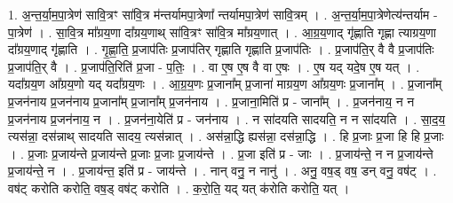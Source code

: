 \documentclass[17pt]{extarticle}
\begin{document}
1. अ॒न्त॒र्या॒म॒पा॒त्रेण॑ सावि॒त्रꣳ सा॑वि॒त्र म॑न्तर्यामपा॒त्रेणा᳚ न्तर्यामपा॒त्रेण॑ सावि॒त्रम् । . अ॒न्त॒र्या॒म॒पा॒त्रेणेत्य॑न्तर्याम - पा॒त्रेण॑ । . सा॒वि॒त्र मा᳚ग्रय॒णा दा᳚ग्रय॒णाथ् सा॑वि॒त्रꣳ सा॑वि॒त्र मा᳚ग्रय॒णात् । . आ॒ग्र॒य॒णाद् गृ॑ह्णाति गृह्णा त्याग्रय॒णा दा᳚ग्रय॒णाद् गृ॑ह्णाति । . गृ॒ह्णा॒ति॒ प्र॒जाप॑तिः प्र॒जाप॑तिर् गृह्णाति गृह्णाति प्र॒जाप॑तिः । . प्र॒जाप॑ति॒र् वै वै प्र॒जाप॑तिः प्र॒जाप॑ति॒र् वै । . प्र॒जाप॑ति॒रिति॑ प्र॒जा - प॒तिः॒ । . वा ए॒ष ए॒ष वै वा ए॒षः । . ए॒ष यद् यदे॒ष ए॒ष यत् । . यदा᳚ग्रय॒ण आ᳚ग्रय॒णो यद् यदा᳚ग्रय॒णः । . आ॒ग्र॒य॒णः प्र॒जाना᳚म् प्र॒जाना॑ माग्रय॒ण आ᳚ग्रय॒णः प्र॒जाना᳚म् । . प्र॒जाना᳚म् प्र॒जन॑नाय प्र॒जन॑नाय प्र॒जाना᳚म् प्र॒जाना᳚म् प्र॒जन॑नाय । . प्र॒जाना॒मिति॑ प्र - जाना᳚म् । . प्र॒जन॑नाय॒ न न प्र॒जन॑नाय प्र॒जन॑नाय॒ न । . प्र॒जन॑ना॒येति॑ प्र - जन॑नाय । . न सा॑दयति सादयति॒ न न सा॑दयति । . सा॒द॒य॒ त्यस॑न्ना॒ दस॑न्नाथ् सादयति सादय॒ त्यस॑न्नात् । . अस॑न्ना॒द्धि ह्यस॑न्ना॒ दस॑न्ना॒द्धि । . हि प्र॒जाः प्र॒जा हि हि प्र॒जाः । . प्र॒जाः प्र॒जाय॑न्ते प्र॒जाय॑न्ते प्र॒जाः प्र॒जाः प्र॒जाय॑न्ते । . प्र॒जा इति॑ प्र - जाः । . प्र॒जाय॑न्ते॒ न न प्र॒जाय॑न्ते प्र॒जाय॑न्ते॒ न । . प्र॒जाय॑न्त॒ इति॑ प्र - जाय॑न्ते । . नान् वनु॒ न नानु॑ । . अनु॒ वष॒ड् वष॒ डन् वनु॒ वष॑ट् । . वष॑ट् करोति करोति॒ वष॒ड् वष॑ट् करोति । . क॒रो॒ति॒ यद् यत् क॑रोति करोति॒ यत् । \newline
\end{document}
